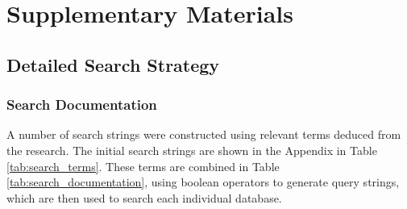 \clearpage
\setcounter{page}{1}
\maketitlesupplementary

\section{Supplementary Materials}
\label{sec:supplementary}

\subsection{Detailed Search Strategy}
\label{sec:search_strategy}

\subsubsection{Search Documentation}


A number of search strings were constructed using relevant terms deduced from the research. The
initial search strings are shown in the Appendix in Table \ref{tab:search_terms}. These terms are
combined in Table \ref{tab:search_documentation}, using boolean operators to generate query
strings, which are then used to search each individual database.


